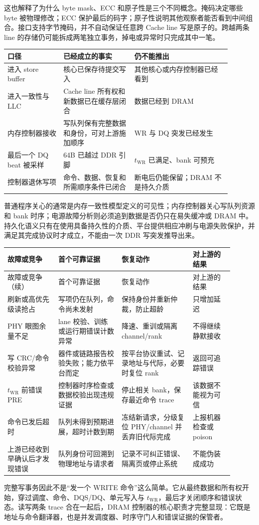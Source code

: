 这也解释了为什么 byte mask、ECC 和原子性是三个不同概念。掩码决定哪些 byte 被物理修改；ECC 保护最后的码字；原子性说明其他观察者能否看到中间组合。接口支持字节掩码，并不自动保证任意跨 Cache line 写是原子的。跨越两条 line 的存储仍可能拆成两笔独立事务，掉电或异常时只完成其中一笔。


\begin{longtable}{L{0.22\linewidth}L{0.29\linewidth}L{0.38\linewidth}}
\toprule
口径 & 已经成立的事实 & 仍不能推出 \\
\midrule
进入 store buffer & 核心已保存待提交写入 & 其他核心或内存控制器已经看到 \\\tablerowrule
进入一致性与 LLC & Cache line 所有权和新数据已在缓存层闭合 & 数据已经到 DRAM \\\tablerowrule
内存控制器接收 & 写队列保有完整数据和身份，可对上游施加顺序 & WR 与 DQ 突发已经发生 \\\tablerowrule
最后一个 DQ beat 被采样 & 64B 已越过 DDR 引脚 & $t_{\mathrm{WR}}$ 已满足、bank 可预充 \\\tablerowrule
控制器退休写项 & 命令、数据、恢复和所需顺序条件已闭合 & 断电后仍能保留；DRAM 不是持久介质 \\
\bottomrule
\end{longtable}

普通程序关心的通常是内存一致性模型定义的可见性；内存控制器关心写队列资源和 bank 时序；电源故障分析则必须追到数据是否仍只在易失缓冲或 DRAM 中。持久化语义只有在使用具备持久性的介质、平台提供相应冲刷与电源失败保护，并满足其完成协议时才成立，不能由一次 DDR 写突发推导出来。


\begin{longtable}{L{0.20\linewidth}L{0.25\linewidth}L{0.29\linewidth}L{0.16\linewidth}}
\toprule
故障或竞争 & 首个可靠证据 & 恢复动作 & 对上游的结果 \\
\midrule
\endfirsthead
\toprule
故障或竞争（续） & 首个可靠证据 & 恢复动作 & 对上游的结果 \\
\midrule
\endhead
刷新或高优先级读抢占 & 写项仍在队列，命令尚未发射 & 保持身份并重新仲裁，防止超龄 & 只增加延迟 \\\tablerowrule
PHY 眼图余量不足 & lane 校验、训练或运行期错误计数异常 & 降速、重训或隔离 channel/rank & 不得继续静默接收 \\\tablerowrule
写 CRC/命令校验异常 & 器件或链路报告校验失败；能力依平台而定 & 按平台协议重试、记录地址与代际，必要时复位 rank & 返回可追踪错误 \\\tablerowrule
$t_{\mathrm{WR}}$ 前错误 PRE & 控制器时序检查或数据校验出现违规证据 & 停止相关 bank，保存最近命令 trace & 该数据不能视为可信 \\\tablerowrule
命令已发后超时 & 队列未得到预期进展，超时计数到期 & 冻结新请求，分级复位 PHY/channel 并丢弃旧代际完成 & 上报机器检查或 poison \\\tablerowrule
上游已经收到早确认后才发现错误 & 队列身份可回溯到物理地址与请求者 & 记录不可纠正错误、隔离页或停止系统 & 不能伪装成成功 \\
\bottomrule
\end{longtable}

完整写事务因此不是“发一个 WRITE 命令”这么简单。它从最终数据和所有权开始，穿过调度、命令、DQS/DQ、单元写入与 $t_{\mathrm{WR}}$，最后才关闭顺序和错误状态。读写两条 trace 合在一起后，DRAM 控制器的核心职责才完整显现：它既是地址与命令翻译器，也是并发调度器、时序守门人和错误证据的保管者。
